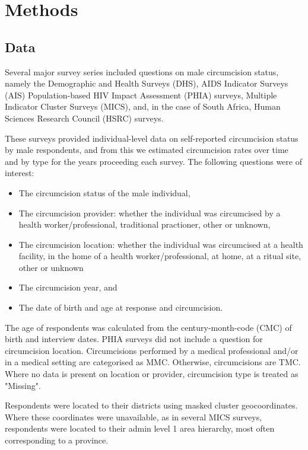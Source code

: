 \documentclass[a4paper, 12pt]{article}
\begin{document}
\newpage

\section{Methods}
\label{sec:orga131cc6}

\subsection{Data}
\label{sec:org020fc8c}

Several major survey series included questions on male circumcision status, namely the Demographic and Health Surveys (DHS), AIDS Indicator Surveys (AIS) Population-based HIV Impact Assessment (PHIA) surveys, Multiple Indicator Cluster Surveys (MICS), and, in the case of South Africa, Human Sciences Research Council (HSRC) surveys.

These surveys provided individual-level data on self-reported circumcision status by male respondents, and from this we estimated circumcision rates over time and by type for the years proceeding each survey. The following questions were of interest:
\begin{itemize}
\item The circumcision status of the male individual,
\item The circumcision provider: whether the individual was circumcised by a health worker/professional, traditional practioner, other or unknown,
\item The circumcision location: whether the individual was circumcised at a health facility, in the home of a health worker/professional, at home, at a ritual site, other or unknown
\item The circumcision year, and
\item The date of birth and age at response and circumcision.
\end{itemize}

The age of respondents was calculated from the century-month-code (CMC) of birth and interview dates.
PHIA surveys did not include a question for circumcision location. Circumcisions performed by a medical professional and/or in a medical setting are categorised as MMC. Otherwise, circumcisions are TMC. Where no data is present on location or provider, circumcision type is treated as "Missing". 

Respondents were located to their districts using masked cluster geocoordinates. Where these coordinates were unavailable, as in several MICS surveys, respondents were located to their admin level 1 area hierarchy, most often corresponding to a province. 
\end{document}
